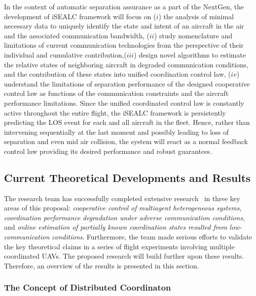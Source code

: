 \documentclass[letter,onecolumn,12pt]{aiaa-tc}
\newcommand{\1}{1_n}
\begin{document}
In the context of automatic separation assurance as a part of the NextGen, the development of iSEALC framework will focus on ($i$) the analysis of  minimal necessary data to uniquely identify the state and intent of an aircraft in the air and the associated communication bandwidth, ($ii$) study nomenclature and limitations of current communication technologies from the perspective of their individual and cumulative contribution,($iii$) design novel algorithms to estimate the relative states of  neighboring aircraft in degraded communication conditions, and the contribution of these states into unified coordination control law, ($iv$) understand the limitations of separation performance of the designed cooperative control law as functions of the communication constraints and the aircraft performance limitations. Since the unified coordinated control law is constantly active throughout the entire flight, the iSEALC framework is persistently predicting the LOS event for each and all aircraft in the fleet. Hence, rather than intervening sequentially at the last moment and possibly leading to loss of separation and even mid air collision, the system will react as a normal feedback control law providing its desired performance and robust guarantees.

\subsection{Current Theoretical Developments and Results}
\label{subsec:current_develop}

The research team has successfully completed extensive research~\cite{xargay2012csm} in three key areas of this proposal: \emph{cooperative control of multiagent heterogeneous systems}, \emph{coordination performance degradation under adverse communication conditions}, and \emph{online estimation of partially known coordination states resulted from low-communication conditions}. Furthermore, the team made serious efforts to validate the key theoretical claims in a series of flight experiments involving multiple coordinated UAVs. The proposed research will build further upon these results. Therefore, an overview of the results is presented in this section.

\subsubsection{The Concept of Distributed Coordinaton }
\end{document}

